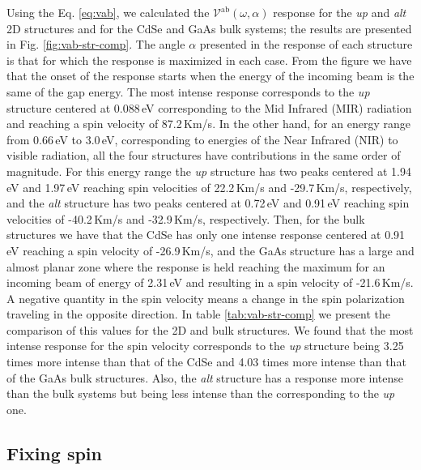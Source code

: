 \documentclass[prb,11pt,tightenlines,twocolumn,aps]{revtex4-1}
\begin{document}
{\color{red}Using the Eq. \eqref{eq:vab}, we calculated the
$\mathcal{V}^{\mathrm{ab}}(\omega,\alpha)$ response for the \emph{up} and
\emph{alt} 2D structures and for the CdSe and GaAs bulk systems; the results
are presented in Fig. \ref{fig:vab-str-comp}. The angle $\alpha$ presented in
the response of each structure is that for which the response is maximized in
each case.}
% 
From the figure we have that the onset of the response starts when the energy of
the incoming beam is the same of the gap energy.
% 
The most intense response corresponds to the \emph{up} structure centered at
0.088\,eV corresponding to the {\color{red} Mid Infrared (MIR)} radiation and
reaching a spin velocity of 87.2\,Km/s.
% 
In the other hand, for an energy range from 0.66\,eV to 3.0\,eV, corresponding
to energies of the {\color{red} Near Infrared (NIR) to visible radiation}, all the four
structures have contributions in the same order of magnitude.
% 
For this energy range the \emph{up} structure has two peaks centered at 1.94\,eV
and 1.97\,eV reaching spin velocities of 22.2\,Km/s and -29.7\,Km/s,
respectively, and the \emph{alt} structure has two peaks centered at 0.72\,eV
and 0.91\,eV reaching spin velocities of -40.2\,Km/s and -32.9\,Km/s,
respectively.
% 
Then, for the bulk structures we have that the CdSe has only one intense
response centered at 0.91\,eV reaching a spin velocity of -26.9\,Km/s, and the
GaAs structure has a large and almost planar zone where the response is held
reaching the maximum for an incoming beam of energy of 2.31\,eV and resulting in
a spin velocity of -21.6\,Km/s.
% 
{\color{red} A negative quantity in the spin velocity means a change in the spin
polarization traveling in the opposite direction.
% 
In table \ref{tab:vab-str-comp} we present the comparison of this values for the
2D and bulk structures. We found that the most intense response for the spin
velocity corresponds to the \emph{up} structure being 3.25 times more intense
than that of the CdSe and 4.03 times more intense than that of the GaAs bulk
structures. Also, the \emph{alt} structure has a response more intense than the
bulk systems but being less intense than the corresponding to the \emph{up}
one.}
% 




\subsection{Fixing spin} %
\label{sec:res-fixspin}
\end{document}
